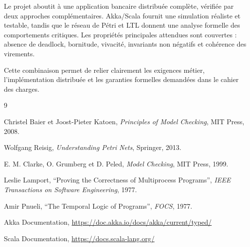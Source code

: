 \documentclass[11pt,a4paper]{article}
\begin{document}
Le projet aboutit à une application bancaire distribuée complète, vérifiée par deux approches complémentaires. Akka/Scala fournit une simulation réaliste et testable, tandis que le réseau de Pétri et LTL donnent une analyse formelle des comportements critiques. Les propriétés principales attendues sont couvertes : absence de deadlock, bornitude, vivacité, invariants non négatifs et cohérence des virements.

Cette combinaison permet de relier clairement les exigences métier, l'implémentation distribuée et les garanties formelles demandées dans le cahier des charges.

\begin{thebibliography}{9}

Christel Baier et Joost-Pieter Katoen,
\textit{Principles of Model Checking},
MIT Press, 2008.

Wolfgang Reisig,
\textit{Understanding Petri Nets},
Springer, 2013.

E. M. Clarke, O. Grumberg et D. Peled,
\textit{Model Checking},
MIT Press, 1999.

Leslie Lamport,
``Proving the Correctness of Multiprocess Programs'',
\textit{IEEE Transactions on Software Engineering}, 1977.

Amir Pnueli,
``The Temporal Logic of Programs'',
\textit{FOCS}, 1977.

Akka Documentation,
\url{https://doc.akka.io/docs/akka/current/typed/}

Scala Documentation,
\url{https://docs.scala-lang.org/}

\end{thebibliography}
\end{document}
